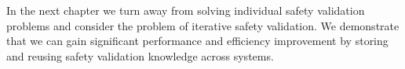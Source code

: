 In the next chapter we turn away from solving individual safety validation problems and consider the problem of iterative safety validation. We demonstrate that we can gain significant performance and efficiency improvement by storing and reusing safety validation knowledge across systems. 